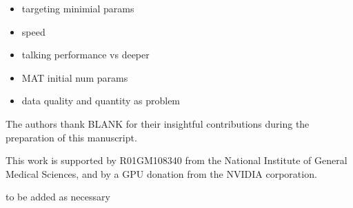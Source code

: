 \documentclass[journal=jmcmar,manuscript=article]{achemso}
\begin{document}
\begin{itemize}
    \item targeting minimial params
    \item speed
    \item talking performance vs deeper
    \item MAT initial num params
    \item data quality and quantity as problem
\end{itemize}

\begin{acknowledgement}


The authors thank BLANK for their insightful contributions during the preparation of this manuscript.

This work is supported by R01GM108340 from the National Institute of General Medical Sciences, and by a GPU donation from the NVIDIA corporation.

\end{acknowledgement}

\begin{suppinfo}

to be added as necessary
\end{suppinfo}


\end{document}
